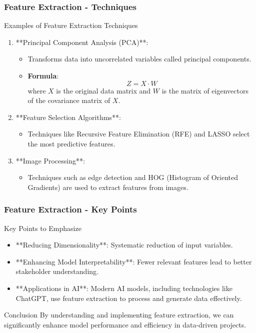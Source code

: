 \documentclass[aspectratio=169]{beamer}
\begin{document}
\begin{frame}[fragile]
    \frametitle{Feature Extraction - Techniques}
    \begin{block}{Examples of Feature Extraction Techniques}
        \begin{enumerate}
            \item **Principal Component Analysis (PCA)**:
                \begin{itemize}
                    \item Transforms data into uncorrelated variables called principal components.
                    \item \textbf{Formula}:
                    \[
                    Z = X \cdot W
                    \]
                    where \( X \) is the original data matrix and \( W \) is the matrix of eigenvectors of the covariance matrix of \( X \).
                \end{itemize}
                
            \item **Feature Selection Algorithms**:
                \begin{itemize}
                    \item Techniques like Recursive Feature Elimination (RFE) and LASSO select the most predictive features.
                \end{itemize}

            \item **Image Processing**:
                \begin{itemize}
                    \item Techniques such as edge detection and HOG (Histogram of Oriented Gradients) are used to extract features from images.
                \end{itemize}
        \end{enumerate}
    \end{block}
\end{frame}

\begin{frame}[fragile]
    \frametitle{Feature Extraction - Key Points}
    \begin{block}{Key Points to Emphasize}
        \begin{itemize}
            \item **Reducing Dimensionality**: Systematic reduction of input variables.
            \item **Enhancing Model Interpretability**: Fewer relevant features lead to better stakeholder understanding.
            \item **Applications in AI**: Modern AI models, including technologies like ChatGPT, use feature extraction to process and generate data effectively.
        \end{itemize}
    \end{block}

    \begin{block}{Conclusion}
        By understanding and implementing feature extraction, we can significantly enhance model performance and efficiency in data-driven projects.
    \end{block}
\end{frame}
\end{document}
